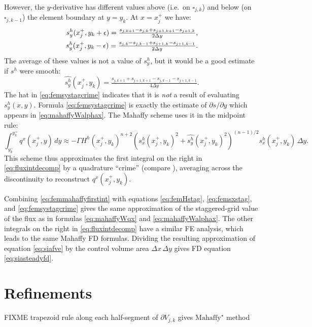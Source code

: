 \documentclass[11pt]{amsart}
\newcommand\eps{\epsilon}
\newcommand{\Mstar}{$\text{Mahaffy}^\star$\xspace}
\begin{document}
However, the $y$-derivative has different values above (i.e.~on $\square_{j,k}$) and below (on $\square_{j,k-1}$) the element boundary at $y = y_k$.  At $x=x_j^+$ we have:
\begin{align}
s^h_y(x_j^+,y_k+\eps) = \tfrac{s_{j,k+1}-s_{j,k} + s_{j+1,k+1}-s_{j+1,k}}{2\Delta y}, \\
s^h_y(x_j^+,y_k-\eps) = \tfrac{s_{j,k}-s_{j,k-1} + s_{j+1,k}-s_{j+1,k-1}}{2\Delta y}. \notag
\end{align}
The average of these values is not a value of $s_y^h$, but it would be a good estimate if $s^h$ were smooth:
\begin{equation}
\widehat{s^h_y}(x_j^+,y_k) = \tfrac{s_{j,k+1} + s_{j+1,k+1} - s_{j,k-1} - s_{j+1,k-1}}{4\Delta y}. \label{eq:femsystagcrime}
\end{equation}
The hat in \eqref{eq:femsystagcrime} indicates that it is \emph{not} a result of evaluating $s^h_y(x,y)$.  Formula \eqref{eq:femsystagcrime} is exactly the estimate of $\partial s/\partial y$ which appears in \eqref{eq:mahaffyWalphax}.  The Mahaffy scheme uses it in the midpoint rule:
\begin{equation}
\int_{y_k^-}^{y_k^+} q^x(x_j^+,y)\,dy \approx - \Gamma H^h(x_j^+,y_k)^{n+2} \left(s^h_x(x_j^+,y_k)^2 + \widehat{s^h_y}(x_j^+,y_k)^2\right)^{(n-1)/2} s^h_x(x_j^+,y_k)\,\Delta y. \label{eq:femmahaffyfirstint}
\end{equation}
This scheme thus approximates the first integral on the right in \eqref{eq:fluxintdecomp} by a quadrature ``crime'' (compare \cite{Strang1972}), averaging across the discontinuity to reconstruct $q^x(x_j^+,y_k)$.

Combining \eqref{eq:femmahaffyfirstint} with equations \eqref{eq:femHstag}, \eqref{eq:femsxstag}, and \eqref{eq:femsystagcrime} gives the same approximation of the staggered-grid value of the flux as in formulas \eqref{eq:mahaffyWqx} and \eqref{eq:mahaffyWalphax}.  The other integrals on the right in \eqref{eq:fluxintdecomp} have a similar FE analysis, which leads to the same Mahaffy FD formulas.  Dividing the resulting approximation of equation \eqref{eq:siafve} by the control volume area $\Delta x\,\Delta y$ gives FD equation \eqref{eq:siasteadyfd}.

\section{Refinements}

FIXME trapezoid rule along each half-segment of  $\partial V_{j,k}$ gives \Mstar method
\end{document}
